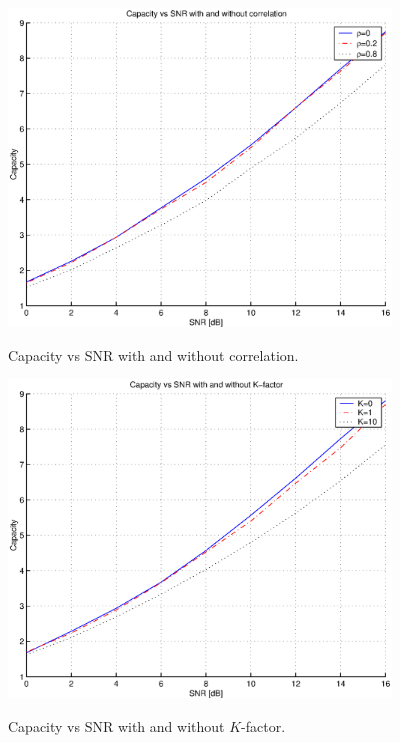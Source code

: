 \documentclass[12pt]{article}
\begin{document}
\begin{enumerate}
\begin{figure}
  \centering
  \includegraphics[width=4in]{p3_correlation.eps}\\
  \caption{\footnotesize Capacity vs SNR with and without correlation.}
  \label{fig:p3_corr}
\end{figure}
\begin{figure}
  \centering
  \includegraphics[width=4in]{p3_kfactor.eps}\\
  \caption{\footnotesize Capacity vs SNR with and without $K$-factor.}
  \label{fig:p3_kfac}
\end{figure}
\end{enumerate}
\end{document}
